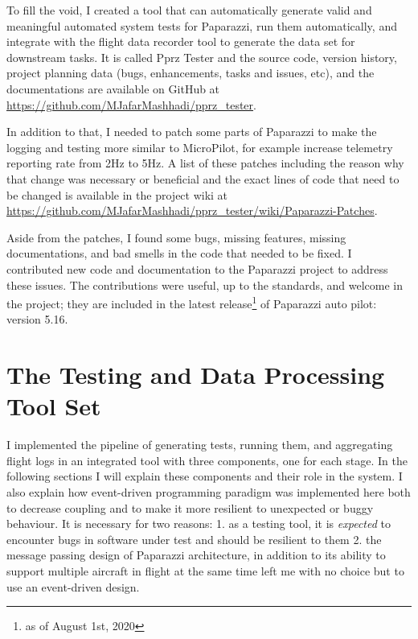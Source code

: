 To fill the void, I created a tool that can automatically generate valid and meaningful automated system tests for Paparazzi, run them automatically, and integrate with the flight data recorder tool to generate the data set for downstream tasks. It is called Pprz Tester and the source code, version history, project planning data (bugs, enhancements, tasks and issues, etc), and the documentations are available on GitHub at \url{https://github.com/MJafarMashhadi/pprz_tester}. 

In addition to that, I needed to patch some parts of Paparazzi to make the logging and testing more similar to MicroPilot, for example increase telemetry reporting rate from 2Hz to 5Hz. A list of these patches including the reason why that change was necessary or beneficial and the exact lines of code that need to be changed is available in the project wiki at \url{https://github.com/MJafarMashhadi/pprz_tester/wiki/Paparazzi-Patches}.

Aside from the patches, I found some bugs, missing features, missing documentations, and bad smells in the code that needed to be fixed. I contributed new code and documentation to the Paparazzi project to address these issues. The contributions were useful, up to the standards, and welcome in the project; they are included in the latest release\footnote{as of August 1st, 2020} of Paparazzi auto pilot: version 5.16.

\section{The Testing and Data Processing Tool Set}
I implemented the pipeline of generating tests, running them, and aggregating flight logs in an integrated tool with three components, one for each stage. In the following sections I will explain these components and their role in the system. I also explain how event-driven programming paradigm was implemented here both to decrease coupling and to make it more resilient to unexpected or buggy behaviour. It is necessary for two reasons: 1. as a testing tool, it is \textit{expected} to encounter bugs in software under test and should be resilient to them 2. the message passing design of Paparazzi architecture, in addition to its ability to support multiple aircraft in flight at the same time left me with no choice but to use an event-driven design.



